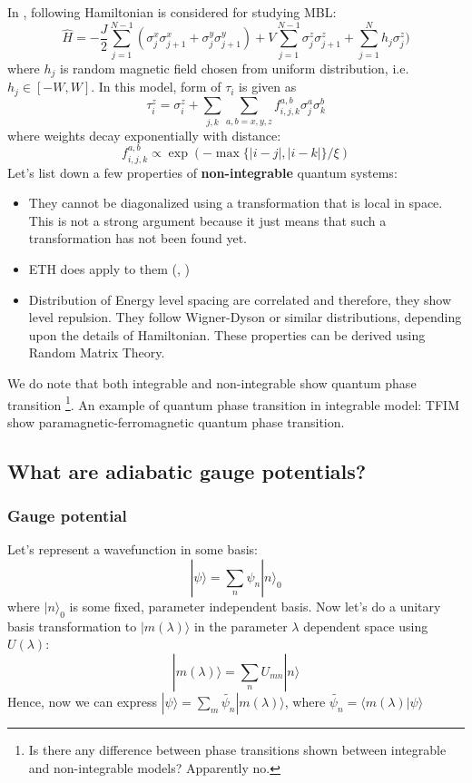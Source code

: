 \documentclass[11pt,a4paper]{article}
\begin{document}
In \cite{abanin2017recent}, following Hamiltonian is considered for studying MBL:
\begin{equation}
\hat H = -\frac{J}{2} \sum_{j=1}^{N-1} ( \sigma_j^x \sigma_{j+1}^x +  \sigma_j^y \sigma_{j+1}^y) +  V \sum_{j=1}^{N-1} \sigma_j^z \sigma_{j+1}^z +  \sum_{j=1}^{N} h_j\sigma_j^{z}) 
\end{equation}
where $h_j$ is random magnetic field chosen from uniform distribution, i.e. $h_j \in [-W,W]$. In this model, form of $\tau_i$ is given as 
\begin{equation}
\tau_i^z= \sigma_i^z + \sum_{j,k} \sum_{a,b=x,y,z} f^{a,b}_{i,j,k} \sigma_j^a \sigma_k^b
\end{equation}
where weights decay exponentially with distance:
\begin{equation}
f^{a,b}_{i,j,k} \propto \exp(- \max\{ |i-j|, |i-k| \}/ \xi)
\end{equation}
Let's list down a few properties of \textbf{non-integrable} quantum systems: 
\begin{itemize}

\item They cannot be diagonalized using a transformation that is local in space. This is not a strong argument because it just means that such a transformation has not been found yet.
\item ETH does apply to them (\cite{d2016quantum}, \cite{rigol2008thermalization})
\item Distribution of Energy level spacing are correlated and therefore, they show level repulsion. They follow Wigner-Dyson or similar distributions, depending upon the details of Hamiltonian. These properties can be derived using Random Matrix Theory.
\end{itemize}


We do note that both integrable and non-integrable show quantum phase transition \footnote{Is there any difference between phase transitions shown between integrable and non-integrable models? Apparently no.}. An example of quantum phase transition in integrable model: TFIM show paramagnetic-ferromagnetic quantum phase transition.

\subsection{What are adiabatic gauge potentials?}
\subsubsection*{Gauge potential}
Let's represent a wavefunction in some basis:
\begin{equation}
|\psi \rangle= \sum_n \psi_n |n \rangle_0
\end{equation}
where $|n \rangle_0$ is some fixed, parameter independent basis. Now let's do a unitary basis transformation to $|m (\lambda) \rangle$ in the parameter $\lambda$ dependent space using $U(\lambda)$:
\begin{equation}
|m (\lambda) \rangle= \sum_n U_{mn} |n \rangle
\end{equation}
Hence, now we can express $|\psi \rangle = \sum_m \tilde{\psi_n}  |m (\lambda) \rangle $, where $\tilde{\psi_n}= \langle  m (\lambda) |\psi \rangle $
 
\end{document}
